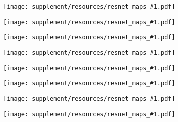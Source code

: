 \renewcommand{\putfig}[1]{%
\begin{subfigure}[b]{.45\textwidth}
                \centering
                \texttt{[image: supplement/resources/resnet\_maps\_\#1.pdf]}
            \end{subfigure}
}
\begin{figure*}
\centering
\begin{subfigure}[c]{\textwidth}
    \centering
    \putfig{0}
    \putfig{1}
    \putfig{2}
    \putfig{3}
    \putfig{4}
    \putfig{5}
    \putfig{6}
    \putfig{7}
    \vspace{-.5em}
\end{subfigure}
\caption{`Input$\times$Gradient' evaluated on different ResNets.
            Since ResNets are piece-wise linear functions, s.t. \mbox{$\vec y(\vec x) = \mat M(\vec x) \vec  x + \vec{b}(\vec x)$},
            this is the ResNet-based equivalent to the CoDA-Net contribution maps.
            }
\label{fig:resnet_maps}
\end{figure*}